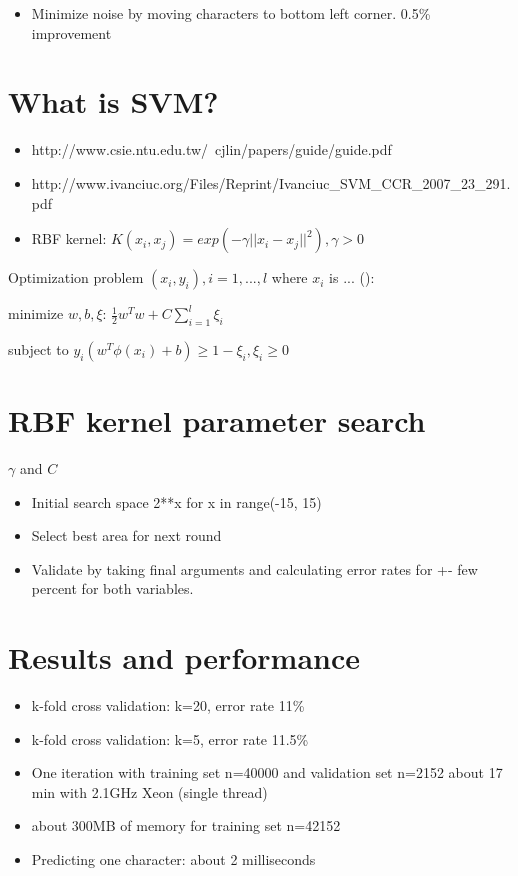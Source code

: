 \documentclass{netsec2012}
\begin{document}
\begin{itemize}
\item Minimize noise by moving characters to bottom left corner. 0.5\% improvement
\end{itemize}

\section{What is SVM?}

\begin{itemize}
\item http://www.csie.ntu.edu.tw/~cjlin/papers/guide/guide.pdf
\item http://www.ivanciuc.org/Files/Reprint/Ivanciuc\_SVM\_CCR\_2007\_23\_291.pdf
\item RBF kernel: $K(x_i, x_j) = exp(-\gamma || x_i - x_j ||^2), \gamma > 0$
\end{itemize}

Optimization problem $(x_i, y_i), i = 1, ..., l$ where $x_i$ is ... (\cite{libsvm_guide}):

minimize $w,b,\xi$: $\frac{1}{2}w^Tw + C \sum_{i=1}^l\xi_i$

subject to $y_i(w^T \phi(x_i) + b) \ge 1 - \xi_i, \xi_i \ge 0$


\section{RBF kernel parameter search}

$\gamma$ and $C$

\begin{itemize}
\item Initial search space 2**x for x in range(-15, 15)
\item Select best area for next round
\item Validate by taking final arguments and calculating error rates for +- few percent for both variables.
\end{itemize}

\section{Results and performance}

\begin{itemize}
\item k-fold cross validation: k=20, error rate 11\%
\item k-fold cross validation: k=5, error rate 11.5\%
\item One iteration with training set n=40000 and validation set n=2152 about 17 min with 2.1GHz Xeon (single thread)
\item about 300MB of memory for training set n=42152
\item Predicting one character: about 2 milliseconds

\end{itemize}
\end{document}
